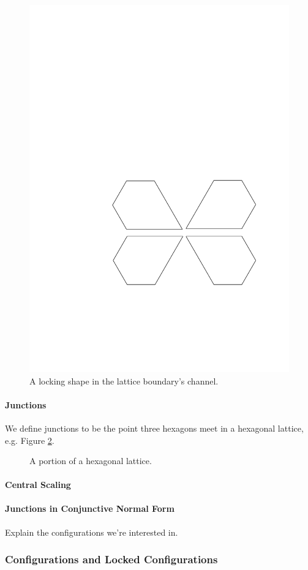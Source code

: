 \begin{figure}[h]
\begin{center}
\includegraphics{graphics/shapeInChannel.pdf}
\end{center} 
\caption{A locking shape in the lattice boundary's channel.}
\label{fig:lockingShapeInChannel}
\end{figure}
\paragraph{Junctions}
We define junctions to be the point three hexagons meet in a hexagonal lattice,
e.g. Figure \ref{fig:lattice}.
\newdimen\R
\R=5cm
\begin{figure}[h] 
\begin{center}
\caption{A portion of a hexagonal lattice.}
\label{fig:lattice}
\end{center}
\end{figure}
\paragraph{Central Scaling}
\paragraph{Junctions in Conjunctive Normal Form}
Explain the configurations we're interested in.
\subsubsection{Configurations and Locked Configurations}